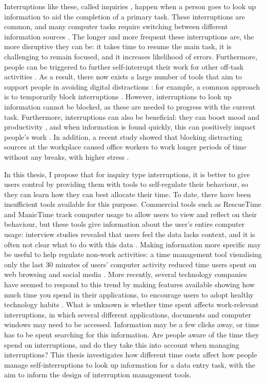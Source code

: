 Interruptions like these, called inquiries \citep{Jin2009}, happen when a person goes to look up information to aid the completion of a primary task. These interruptions are common, and many computer tasks require switching between  different information sources \citep{Cangiano2009}. The longer and more frequent these interruptions are, the more disruptive they can be: it takes time to resume the main task, it is challenging to remain focused, and it increases likelihood of errors. Furthermore, people can be triggered to further self-interrupt their work for other off-task activities \citep{Jin2009}. As a result, there now exists a large number of tools that aim to support people in avoiding digital distractions \citep{Lyngs2018}: for example, a common approach is to temporarily block interruptions \citep{Kim2017}. However, interruptions to look up information cannot be blocked, as these are needed to progress with the current task. Furthermore, interruptions can also be beneficial: they can boost mood and productivity \citep{Mark2014a}, and when information is found quickly, this can positively impact people’s work \citep{Jin2009}. In addition, a recent study showed that blocking distracting sources at the workplace caused office workers to work longer periods of time without any breaks, with higher stress \citep{Mark2018}.

In this thesis, I propose that for inquiry type interruptions, it is better to give users control by providing them with tools to self-regulate their behaviour, so they can learn how they can best allocate their time. To date, there have been insufficient tools available for this purpose. Commercial tools such as RescueTime and ManicTime track computer usage to allow users to view and reflect on their behaviour, but these tools give information about the user’s entire computer usage: interview studies revealed that users feel the data lacks context, and it is often not clear what to do with this data \citep{Collins2014}. Making information more specific may be useful to help regulate non-work activities: a time management tool visualising only the last 30 minutes of users' computer activity reduced time users spent on web browsing and social media \citep{Whittaker2016}. More recently, several technology companies have seemed to respond to this trend by making features available showing how much time you spend in their applications, to encourage users to adopt healthy technology habits \citep{Constine2018, Lynley2018}. What is unknown is whether time spent affects work-relevant interruptions, in which several different applications, documents and computer windows may need to be accessed. Information may be a few clicks away, or time has to be spent searching for this information. Are people aware of the time they spend on interruptions, and do they take this into account when managing interruptions? This thesis investigates how different time costs affect how people manage self-interruptions to look up information for a data entry task, with the aim to inform the design of interruption management tools.

